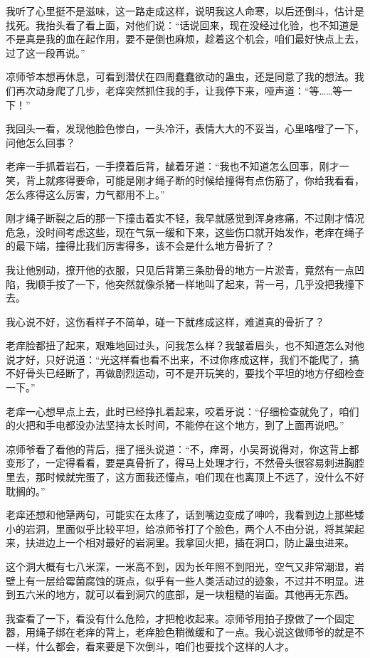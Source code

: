 我听了心里挺不是滋味，这一路走成这样，说明我这人命寒，以后还倒斗，估计是找死。我抬头看了看上面，对他们说：“话说回来，现在没经过化验，也不知道是不是真是我的血在起作用，要不是倒也麻烦，趁着这个机会，咱们最好快点上去，过了这一段再说。”

凉师爷本想再休息，可看到潜伏在四周蠢蠢欲动的蛊虫，还是同意了我的想法。我们再次动身爬了几步，老痒突然抓住我的手，让我停下来，哑声道：“等……等一下！”

我回头一看，发现他脸色惨白，一头冷汗，表情大大的不妥当，心里咯噔了一下，问他怎么回事？

老痒一手抓着岩石，一手摸着后背，龇着牙道：“我也不知道怎么回事，刚才一笑，背上就疼得要命，可能是刚才绳子断的时候给撞得有点伤筋了，你给我看看，怎么疼得这么厉害，力气都用不上。”

刚才绳子断裂之后的那一下撞击着实不轻，我早就感觉到浑身疼痛，不过刚才情况危急，没时间考虑这些，现在气氛一缓和下来，这些伤口就开始发作，老痒在绳子的最下端，撞得比我们厉害得多，该不会是什么地方骨折了？

我让他别动，撩开他的衣服，只见后背第三条肋骨的地方一片淤青，竟然有一点凹陷，我顺手按了一下，他突然就像杀猪一样地叫了起来，背一弓，几乎没把我撞下去。

我心说不好，这伤看样子不简单，碰一下就疼成这样，难道真的骨折了？

老痒脸都扭了起来，艰难地回过头，问我怎么样？我皱着眉头，也不知道怎么对他说才好，只好说道：“光这样看也看不出来，不过你疼成这样，我们不能爬了，搞不好骨头已经断了，再做剧烈运动，可不是开玩笑的，要找个平坦的地方仔细检查一下。”

老痒一心想早点上去，此时已经挣扎着起来，咬着牙说：“仔细检查就免了，咱们的火把和手电都没办法坚持太长时间，不能停在这个地方，到了上面再说吧。”

凉师爷看了看他的背后，摇了摇头说道：“不，痒哥，小吴哥说得对，你这背上都变形了，一定得看看，要是真骨折了，得马上处理才行，不然骨头很容易刺进胸腔里去，那时候就完蛋了，这方面我还懂点，咱们现在也离顶上不远了，没什么不好耽搁的。”

老痒还想和他犟两句，可能实在太疼了，话到嘴边变成了呻吟，我看到边上那些矮小的岩洞，里面似乎比较平坦，给凉师爷打了个脸色，两个人不由分说，将其架起来，扶进边上一个相对最好的岩洞里。我拿回火把，插在洞口，防止蛊虫进来。

这个洞大概有七八米深，一米高不到，因为长年照不到阳光，空气又非常潮湿，岩壁上有一层给霉菌腐蚀的斑点，似乎有一些人类活动过的迹象，不过并不明显。进到五六米的地方，就可以看到洞穴的底部，是一块粗糙的岩面。其他再无东西。

我查看了一下，看没有什么危险，才把枪收起来。凉师爷用拍子撩做了一个固定器，用绳子绑在老痒的背上，老痒脸色稍微缓和了一点。我心说这做师爷的就是不一样，什么都会，看来要是下次倒斗，咱们也要找个这样的人才。

